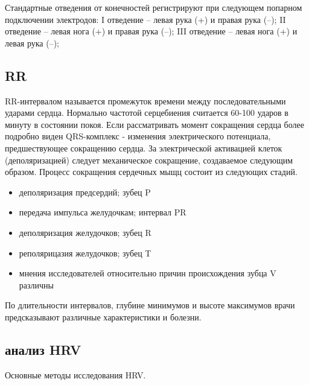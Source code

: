 Стандартные отведения от конечностей регистрируют при следующем попарном подключении электродов:
I отведение – левая рука (+) и правая рука (–);
II отведение – левая нога (+) и правая рука (–);
III отведение – левая нога (+) и левая рука (–);

\subsection{RR}
RR-интервалом называется промежуток времени между последовательными ударами сердца. Нормально частотой серцебиения считается 60-100 ударов в минуту в состоянии покоя. Если рассматривать момент сокращения сердца более подробно \cite{polarization_heart} виден QRS-комплекс - изменения электрического потенциала, предшествующее сокращению сердца. За электрической активацией клеток (деполяризацией) следует механическое сокращение, создаваемое следующим образом. Процесс сокращения сердечных мыщц состоит из следующих стадий.

\begin{itemize}
	\item деполяризация предсердий; зубец P
	\item передача импульса желудочкам; интервал PR
	\item деполяризация желудочков; зубец R
	\item реполярицазия желудочков; зубец T
	\item мнения исследователей относительно причин происхождения зубца V различны
\end{itemize}

По длительности интервалов, глубине минимумов и высоте максимумов врачи предсказывают различные характеристики и болезни.


\subsection{анализ HRV}

Основные методы исследования HRV.

